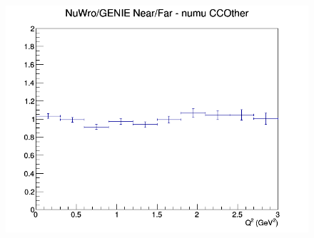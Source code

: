 \documentclass[12pt]{article}
\begin{document}
\begin{figure}[h]
\endminipage
{}
\includegraphics[width=\linewidth]{eff_Q2/FGT/ratios/CCOther_NuWro_GENIE_numu_NF_Q2.png}
\endminipage
\newline
\end{figure}
\clearpage
\end{document}
